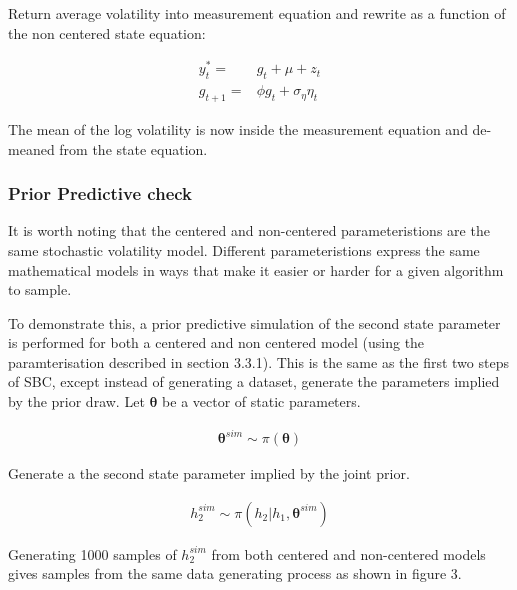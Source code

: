 \documentclass[12pt, a4paper]{article}
\begin{document}
        Return average volatility into measurement equation and rewrite as a function of the non centered state equation:

        $$
        \begin{aligned}
        y^{\ast}_t =& g_t + \mu + z_t \\
        g_{t+1} =& \phi g_t + \sigma_{\eta}\eta_{t}
        \end{aligned}
        $$

        The mean of the log volatility is now inside the measurement equation and de-meaned from the state equation.
    
    \subsubsection{Prior Predictive check}
        It is worth noting that the centered and non-centered parameteristions are the same stochastic volatility model. Different parameteristions express the same mathematical models in ways that make it easier or harder for a given algorithm to sample. 

        To demonstrate this, a prior predictive simulation of the second state parameter is performed for both a centered and non centered model (using the paramterisation described in section 3.3.1). This is the same as the first two steps of SBC, except instead of generating a dataset, generate the parameters implied by the prior draw. Let $\boldsymbol{\theta}$ be a vector of static parameters.

        $$
        \begin{aligned}
        \boldsymbol{\theta}^{sim} \sim \pi(\boldsymbol{\theta})
        \end{aligned}
        $$

        Generate a the second state parameter implied by the joint prior.

        $$
        \begin{aligned}
        h_2^{sim} \sim \pi (h_2|h_1, \boldsymbol{\theta}^{sim})
        \end{aligned}
        $$

        Generating 1000 samples of $h_2^{sim}$ from both centered and non-centered models gives samples from the same data generating process as shown in figure 3. 
\end{document}
